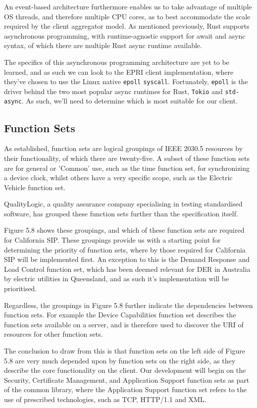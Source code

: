 An event-based architecture furthermore enables us to take advantage of multiple OS threads, and therefore multiple CPU cores, as to best accommodate the scale required by the client aggregator model.
As mentioned previously, Rust supports asynchronous programming, with runtime-agnostic support for await and async syntax, of which there are multiple Rust async runtime available.

The specifics of this asynchronous programming architecture are yet to be learned, and as such we can look to the EPRI client implementation, where they've chosen to use the Linux native \texttt{epoll} \texttt{syscall}.
Fortunately, \texttt{epoll} is the driver behind the two most popular async runtimes for Rust, \texttt{Tokio} and \texttt{std-async}. As such, we'll need to determine which is most suitable for our client.

\subsection{Function Sets}
As established, function sets are logical groupings of IEEE 2030.5 resources by their functionality, of which there are twenty-five.
A subset of these function sets are for general or 'Common' use, such as the time function set, for synchronizing a device clock, whilst others have a very specific scope, such as the Electric Vehicle function set. 

QualityLogic, a quality assurance company specialising in testing standardised software, has grouped these function sets further than the specification itself.

Figure 5.8 shows these groupings, and which of these function sets are required for California SIP.
These groupings provide us with a starting point for determining the priority of function sets, where by those required for California SIP will be implemented first.
An exception to this is the Demand Response and Load Control function set, which has been deemed relevant for DER in Australia by electric utilities in Queensland, and as such it's implementation will be prioritised. \cite[]{QueenslandDER}

Regardless, the groupings in Figure 5.8 further indicate the dependencies between function sets. For example the Device Capabilities function set describes the function sets available on a server, and is therefore used to discover the URI of resources for other function sets.

The conclusion to draw from this is that function sets on the left side of Figure 5.8 are very much depended upon by function sets on the right side, as they describe the core functionality on the client.
Our development will begin on the Security, Certificate Management, and Application Support function sets as part of the common library, where the Application Support function set refers to the use of prescribed technologies, such as TCP, HTTP/1.1 and XML.


